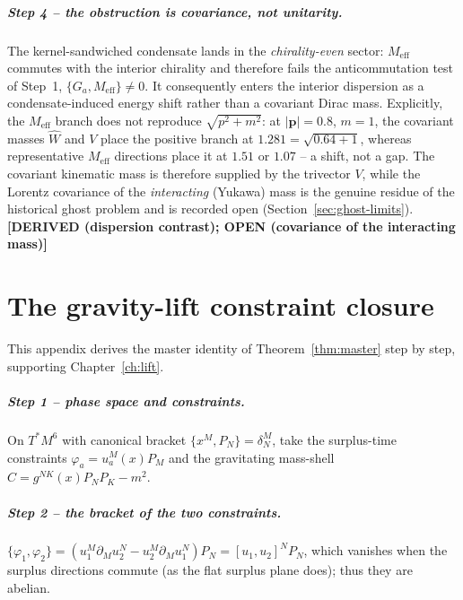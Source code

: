 \documentclass[11pt,oneside]{book}
\newcommand{\Wh}{\hat{W}}                         %
\newcommand{\status}[1]{{\sffamily\bfseries\color{statuscol}[#1]}}
\theoremstyle{plain}
\theoremstyle{definition}
\theoremstyle{remark}
\begin{document}
\paragraph{Step 4 -- the obstruction is covariance, not unitarity.}
The kernel-sandwiched condensate lands in the \emph{chirality-even} sector: $M_{\mathrm{eff}}$
commutes with the interior chirality and therefore fails the anticommutation test of Step~1,
$\{G_a,M_{\mathrm{eff}}\}\neq0$. It consequently enters the interior dispersion as a
condensate-induced energy shift rather than a covariant Dirac mass. Explicitly, the
$M_{\mathrm{eff}}$ branch does not reproduce $\sqrt{p^2+m^2}$: at $\lvert\mathbf p\rvert=0.8$,
$m=1$, the covariant masses $\Wh$ and $V$ place the positive branch at $1.281=\sqrt{0.64+1}$,
whereas representative $M_{\mathrm{eff}}$ directions place it at $1.51$ or $1.07$ -- a shift, not
a gap. The covariant kinematic mass is therefore supplied by the trivector $V$, while the Lorentz
covariance of the \emph{interacting} (Yukawa) mass is the genuine residue of the historical ghost
problem and is recorded open (Section~\ref{sec:ghost-limits}).
\status{DERIVED (dispersion contrast); OPEN (covariance of the interacting mass)}

\chapter{The gravity-lift constraint closure}
\label{app:lift}

This appendix derives the master identity of Theorem~\ref{thm:master} step by step,
supporting Chapter~\ref{ch:lift}.

\paragraph{Step 1 -- phase space and constraints.}
On $T^*M^6$ with canonical bracket $\{x^M,P_N\}=\delta^M_N$, take the surplus-time
constraints $\varphi_a=u_a^M(x)P_M$ and the gravitating mass-shell
$C=g^{NK}(x)P_NP_K-m^2$.

\paragraph{Step 2 -- the bracket of the two constraints.}
$\{\varphi_1,\varphi_2\}=(u_1^M\partial_M u_2^N-u_2^M\partial_M u_1^N)P_N
=[u_1,u_2]^NP_N$, which vanishes when the surplus directions commute (as the flat
surplus plane does); thus they are abelian.
\end{document}
